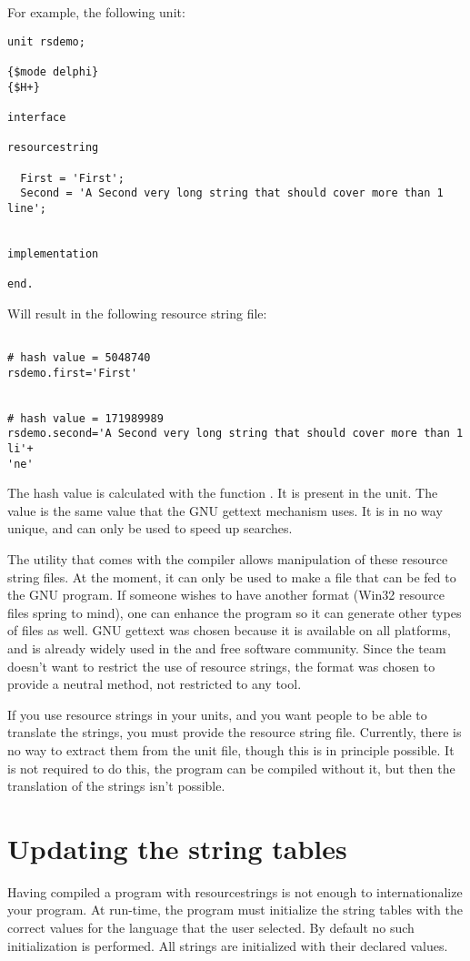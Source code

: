 For example, the following unit:
\begin{verbatim}
unit rsdemo;

{$mode delphi}
{$H+}

interface

resourcestring

  First = 'First';
  Second = 'A Second very long string that should cover more than 1 line';


implementation

end.
\end{verbatim}
Will result in the following resource string file:
\begin{verbatim}

# hash value = 5048740
rsdemo.first='First'


# hash value = 171989989
rsdemo.second='A Second very long string that should cover more than 1 li'+
'ne'

\end{verbatim}
The hash value is calculated with the function . It is present in
the  unit. The value is the same value that the GNU gettext
mechanism uses. It is in no way unique, and can only be used to speed up
searches.

The  utility that comes with the \fpc compiler allows 
manipulation of these resource string files. At the moment, it can only be used
to make a  file that can be fed to the GNU  program.
If someone wishes to have another format (Win32 resource files spring to
mind), one can enhance the  program so it can generate
other types of files as well. GNU gettext was chosen because it is available
on all platforms, and is already widely used in the  and free
software community. Since the \fpc team doesn't want to restrict the use
of resource strings, the  format was chosen to provide a neutral
method, not restricted to any tool.

If you use resource strings in your units, and you want people to be able to
translate the strings, you must provide the resource string file. Currently,
there is no way to extract them from the unit file, though this is in
principle possible. It is not required to do this, the program can be
compiled without it, but then the translation of the strings isn't possible.

\section{Updating the string tables}
Having compiled a program with resourcestrings is not enough to
internationalize your program. At run-time, the program must initialize
the string tables with the correct values for the language that the user
selected. By default no such initialization is performed. All strings
are initialized with their declared values.

